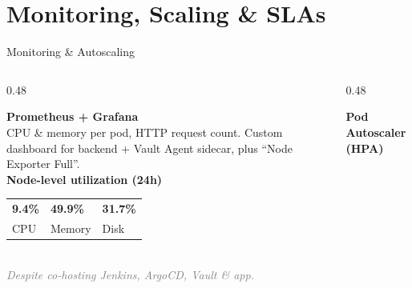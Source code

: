\section{Monitoring, Scaling \& SLAs}

{

   \begin{frame}{Monitoring \& Autoscaling}
    \vspace{0.2cm}
    \begin{columns}[T]
        
        \begin{column}{0.48\textwidth}
            \begin{tcolorbox}[colback=white, colframe=gray!30, arc=2pt, boxrule=0.5pt, top=3mm, bottom=3mm]
                \textcolor{blue!70!black}{\Large\faChartLine}\hspace{0.15cm} \textbf{\large Prometheus + Grafana}\\[0.3cm]
                
                \scriptsize CPU \& memory per pod, HTTP request count. Custom dashboard for backend + Vault Agent sidecar, plus ``Node Exporter Full''.\\[0.6cm]
                
                \textcolor{gray!80!black}{\textbf{\footnotesize Node-level utilization (24h)}}\\[0.1cm]
                \begin{tabular}{@{}p{1.3cm} p{1.6cm} p{1.3cm}@{}}
                    \textcolor{green!60!black}{\large \textbf{9.4\%}} & \textcolor{orange!80!black}{\large \textbf{49.9\%}} & \textcolor{green!60!black}{\large \textbf{31.7\%}} \\
                    \tiny CPU & \tiny Memory & \tiny Disk
                \end{tabular}\\[0.3cm]
                
                \tiny \textit{\textcolor{gray}{Despite co-hosting Jenkins, ArgoCD, Vault \& app.}}
            \end{tcolorbox}
        \end{column}
        
        \begin{column}{0.48\textwidth}
            \begin{tcolorbox}[colback=white, colframe=gray!30, arc=2pt, boxrule=0.5pt, top=3mm, bottom=3mm]
                \textcolor{teal!70!black}{\Large\faBalanceScale}\hspace{0.15cm} \textbf{\large Pod Autoscaler (HPA)}\\[0.3cm]
                

\end{tcolorbox}
\end{column}
\end{columns}
\end{frame}}
